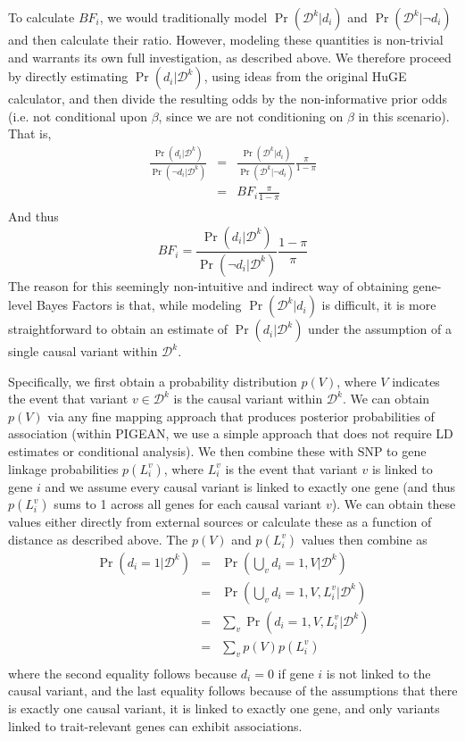 \documentclass[11pt]{article}
\begin{document}
To calculate $BF_i$, we would traditionally model
$\Pr\left(\mathcal{D}^k|d_i\right)$ and
$\Pr\left(\mathcal{D}^k|\neg d_i\right)$ and then calculate their ratio. However, modeling these quantities is
non-trivial and warrants its own full investigation, as described
above. We therefore proceed by directly estimating
$\Pr\left(d_i|\mathcal{D}^k\right)$, using ideas from the original
HuGE calculator\cite{}, and then divide the resulting odds by the
non-informative prior odds (i.e. not conditional upon $\beta$, since
we are not conditioning on $\beta$ in this scenario). That is, 
\begin{eqnarray*}
\frac{\Pr\left(d_i|\mathcal{D}^k\right)}{\Pr\left(\neg d_i|\mathcal{D}^k\right)} & = &
\frac{\Pr\left(\mathcal{D}^k|d_i\right)}{\Pr\left(\mathcal{D}^k|\neg d_i\right)}\frac{\pi}{1-\pi} \\
& = & BF_i \frac{\pi}{1-\pi} \\
\end{eqnarray*}
And thus
\[BF_i = \frac{\Pr\left(d_i|\mathcal{D}^k\right)}{\Pr\left(\neg
  d_i|\mathcal{D}^k\right)} \frac{1-\pi}{\pi}\]
The reason for this seemingly non-intuitive and indirect way of
obtaining gene-level Bayes Factors is that, while modeling
$\Pr\left(\mathcal{D}^k|d_i\right)$ is difficult, it is more
straightforward to obtain an estimate of 
$\Pr\left(d_i|\mathcal{D}^k\right)$ under the assumption of a single
causal variant within $\mathcal{D}^k$.

Specifically, we first obtain a probability
distribution $p(V)$, where $V$ indicates the event that variant $v
\in \mathcal{D}^k$ is the causal variant within $\mathcal{D}^k$. We can
obtain $p(V)$ via any fine mapping approach that produces posterior
probabilities of association (within PIGEAN, we use a simple approach
that does not require LD estimates or conditional analysis\cite{}). We
then combine these with SNP to gene linkage probabilities $p(L^v_i)$, where $L^v_i$
is the event that variant $v$ is linked to gene $i$ and we assume
every causal variant is linked to exactly one gene (and thus $p(L^v_i)$
sums to 1 across all genes for each causal variant $v$). We can obtain
these values either directly from external sources or calculate these
as a function of distance as described above. The $p(V)$ and
$p(L^v_i)$ values then combine as
\begin{eqnarray*}
\Pr\left(d_i=1|\mathcal{D}^k\right) & = &
\Pr\left(\bigcup_v d_i=1,V|\mathcal{D}^k\right) \\
&=& \Pr\left(\bigcup_v d_i=1,V,L^v_i|\mathcal{D}^k\right) \\
&=& \sum_v \Pr\left(d_i=1,V,L^v_i|\mathcal{D}^k\right) \\
&=& \sum_v p(V)p(L^v_i) \\
\end{eqnarray*}
where the second equality follows because $d_i=0$ if gene $i$ is not linked
to the causal variant, and the last equality follows because of the
assumptions that there is exactly one causal variant, it is linked
to exactly one gene, and only variants linked to trait-relevant genes
can exhibit associations.
\end{document}
